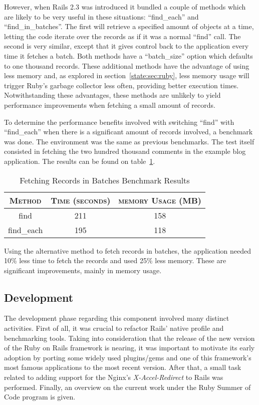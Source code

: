 However, when Rails 2.3 was introduced it bundled a couple of methods which are likely to be very useful in these situations: ``find\_each'' and ``find\_in\_batches''. The first will retrieve a specified amount of objects at a time, letting the code iterate over the records as if it was a normal ``find'' call. The second is very similar, except that it gives control back to the application every time it fetches a batch. Both methods have a ``batch\_size'' option which defaults to one thousand records. These additional methods have the advantage of using less memory and, as explored in section~\ref{state:sec:ruby}, less memory usage will trigger Ruby's garbage collector less often, providing better execution times. Notwithstanding these advantages, these methods are unlikely to yield performance improvements when fetching a small amount of records.

To determine the performance benefits involved with switching ``find'' with ``find\_each'' when there is a significant amount of records involved, a benchmark was done. The environment was the same as previous benchmarks. The test itself consisted in fetching the two hundred thousand comments in the example blog application. The results can be found on table~\ref{tab:fetch_in_batches}.
\begin{table}[h!t]
  \centering
  \caption{Fetching Records in Batches Benchmark Results}
  \label{tab:fetch_in_batches}
  
  \begin{tabular}{c|c|c}
  
    \textbf{\textsc{Method}} & \textbf{\textsc{Time (seconds)}} & \textbf{\textsc{memory Usage (MB)}} \\ \hline
    find & 211 & 158 \\ \hline
    find\_each & 195 & 118 \\
  \end{tabular}
\end{table}

Using the alternative method to fetch records in batches, the application needed 10\% less time to fetch the records and used 25\% less memory. These are significant improvements, mainly in memory usage.

\subsection{Development}
The development phase regarding this component involved many distinct activities. First of all, it was crucial to refactor Rails' native profile and benchmarking tools. Taking into consideration that the release of the new version of the Ruby on Rails framework is nearing, it was important to motivate its early adoption by porting some widely used plugins/gems and one of this framework's most famous applications to the most recent version. After that, a small task related to adding support for the Nginx's \textit{X-Accel-Redirect} to Rails was performed. Finally, an overview on the current work under the Ruby Summer of Code program is given.

